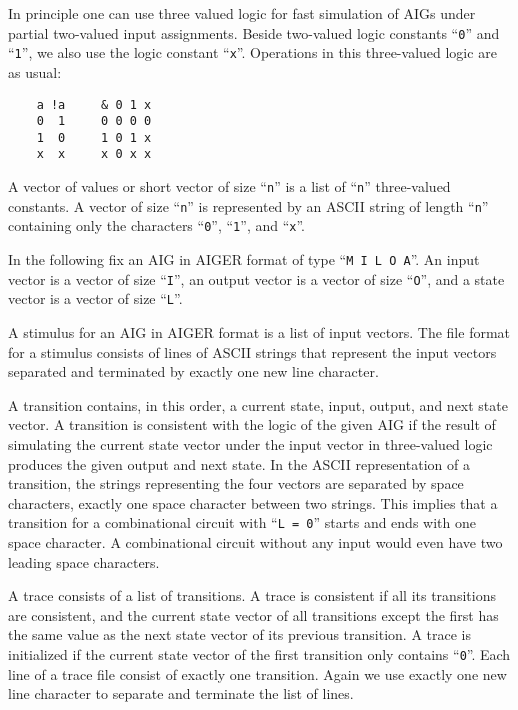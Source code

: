 \documentclass[10pt]{llncs}
\begin{document}
  In principle one can use three valued logic for fast simulation of AIGs
  under partial two-valued input assignments.  Beside two-valued logic
  constants ``\texttt{0}'' and ``\texttt{1}'', we also use the logic constant
  ``\texttt{x}''.  Operations in
  this three-valued logic are as usual:

\begin{verbatim}
    a !a     & 0 1 x
    0  1     0 0 0 0
    1  0     1 0 1 x
    x  x     x 0 x x
\end{verbatim}

  A vector of values or short vector of size ``\texttt{n}'' is a list of
  ``\texttt{n}''
  three-valued constants.  A vector of size ``\texttt{n}'' is represented by
  an ASCII string of length ``\texttt{n}'' containing only the characters
  ``\texttt{0}'',
  ``\texttt{1}'', and ``\texttt{x}''.

  In the following fix an AIG in AIGER format of type ``\texttt{M I L O A}''.  An input
  vector is a vector of size ``\texttt{I}'', an output vector is a vector of size
  ``\texttt{O}'',
  and a state vector is a vector of size ``\texttt{L}''.

  A stimulus for an AIG in AIGER format is a list of input vectors.
  The file format for a stimulus consists of lines of ASCII strings that
  represent the input vectors separated and terminated by exactly one new
  line character.

  A transition contains, in this order, a current state, input, output, and
  next state vector.  A transition is consistent with the logic of the given
  AIG if the result of simulating the current state vector under the input
  vector in three-valued logic produces the given output and next state.  In
  the ASCII representation of a transition, the strings representing the
  four vectors are separated by space characters, exactly one space
  character between two strings.  This implies that a transition for a
  combinational circuit with ``\texttt{L = 0}'' starts and ends with one space
  character.  A combinational circuit without any input would even have two
  leading space characters.

  A trace consists of a list of transitions.  A trace is consistent if all
  its transitions are consistent, and the current state vector of all
  transitions except the first has the same value as the next state vector
  of its previous transition.  A trace is initialized if the current state
  vector of the first transition only contains ``\texttt{0}''.  Each line of a trace
  file consist of exactly one transition.  Again we use exactly one new line
  character to separate and terminate the list of lines.
  
\end{document}
